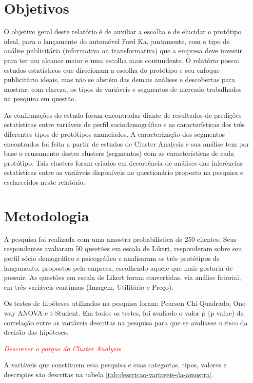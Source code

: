 \section{Objetivos}

\label{sec:objetivos}

O objetivo geral deste relatório é de auxiliar a escolha e de elucidar
o protótipo ideal, para o lançamento do automóvel Ford Ka\texttrademark, juntamente,
com o tipo de análise publicitária (informativa ou transformativa)
que a empresa deve investir para ter um alcance maior e uma escolha
mais contundente. O relatório possui estudos estatísticos que direcionam
a escolha do protótipo e seu enfoque publicitário ideais, mas não
se abstém das demais análises e descobertas para mostrar, com clareza,
os tipos de variáveis e segmentos de mercado trabalhados na pesquisa
em questão. 

As confirmações do estudo foram encontradas diante de resultados de
predições estatísticas entre variáveis de perfil sociodemográfico
e as características dos três diferentes tipos de protótipos anunciados.
A caracterização dos segmentos encontrados foi feita a partir de estudos
de Cluster Analysis e sua análise tem por base o cruzamento destes
clusters (segmentos) com as características de cada protótipo. Tais
clusters foram criados em decorrência de análises das inferências
estatísticas entre as variáveis disponíveis no questionário proposto
na pesquisa e esclarecidos neste relatório.


\section{Metodologia}

A pesquisa foi realizada com uma amostra probabilística de 250 clientes.
Seus respondentes avaliaram 50 questões em escala de Likert, responderam
sobre seu perfil sócio demográfico e psicográfico e analisaram os
três protótipos de lançamento, propostos pela empresa, escolhendo
aquele que mais gostaria de possuir. As questões em escala de Likert
foram convertidas, via análise fatorial, em três variáveis contínuas
(Imagem, Utilitário e Preço).

Os testes de hipóteses utilizados na pesquisa foram: Pearson Chi-Quadrado,
One-way ANOVA e t-Student. Em todos os testes, foi avaliado o valor
p (p value) da correlação entre as variáveis descritas na pesquisa
para que se avaliasse o risco da decisão das hipóteses.

\textcolor{red}{\emph{Descrever o porque do Cluster Analysis}}

A variáveis que constituem essa pesquisa e suas categorias, tipos,
valores e descrições são descritas na tabela \ref{tab:descricao-variaveis-da-amostra}.

